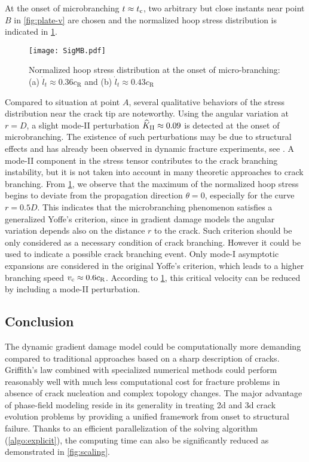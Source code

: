 At the onset of microbranching $t\approx t_{\mathrm{c}}$, two arbitrary but close instants near point $B$ in \cref{fig:plate-v} are chosen and the normalized hoop stress distribution is indicated in \cref{fig:SigMB}.
\begin{figure}[htbp]
\centering
\texttt{[image: SigMB.pdf]}
\caption{Normalized hoop stress distribution at the onset of micro-branching: (a) $\dot{l}_t\approx 0.36c_\mathrm{R}$ and (b) $\dot{l}_t\approx 0.43c_\mathrm{R}$} \label{fig:SigMB}
\end{figure}
Compared to situation at point $A$, several qualitative behaviors of the stress distribution near the crack tip are noteworthy. Using the angular variation at $r=D$, a slight mode-II perturbation $\widehat{K}_\RNN{2}\approx 0.09$ is detected at the onset of microbranching. The existence of such perturbations may be due to structural effects and has already been observed in dynamic fracture experiments, see \cite{BoueCohenFineberg:2015}. A mode-II component in the stress tensor contributes to the crack branching instability, but it is not taken into account in many theoretic approaches to crack branching. From \cref{fig:SigMB}, we observe that the maximum of the normalized hoop stress begins to deviate from the propagation direction $\theta=0$, especially for the curve $r=0.5D$. This indicates that the microbranching phenomenon satisfies a generalized Yoffe's criterion, since in gradient damage models the angular variation depends also on the distance $r$ to the crack. Such criterion should be only considered as a necessary condition of crack branching. However it could be used to indicate a possible crack branching event. Only mode-I asymptotic expansions are considered in the original Yoffe's criterion, which leads to a higher branching speed $v_{\mathrm{c}}\approx 0.6c_\mathrm{R}$. According to \cref{fig:SigMB}, this critical velocity can be reduced by including a mode-II perturbation.

\subsection*{Conclusion}
The dynamic gradient damage model could be computationally more demanding compared to traditional approaches based on a sharp description of cracks. Griffith's law combined with specialized numerical methods could perform reasonably well with much less computational cost for fracture problems in absence of crack nucleation and complex topology changes. The major advantage of phase-field modeling reside in its generality in treating 2d and 3d crack evolution problems by providing a unified framework from onset to structural failure. Thanks to an efficient parallelization of the solving algorithm (\cref{algo:explicit}), the computing time can also be significantly reduced as demonstrated in \cref{fig:scaling}.

